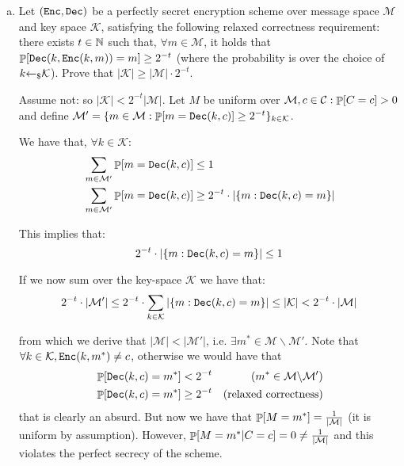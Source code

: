\begin{enumerate}[(a)]
\begin{solution}
	      \end{solution}

	\item Let $(\enc, \dec)$ be a perfectly secret encryption scheme over message space $\mathcal{M}$ and key space $\mathcal{K}$, satisfying the following relaxed correctness requirement: there exists $t \in \N$ such that, $\forall m \in \mathcal{M}$, it holds that $\P[\dec(k, \enc(k, m)) = m] \ge 2^{-t}$ (where the probability is over the choice of $k \ud \mathcal{K}$). Prove that $|\mathcal{K}| \ge |\mathcal{M}| \cdot 2^{-t}$.

	      \begin{solution}
		      Assume not: so $|\mathcal{K}| < 2^{-t}|\mathcal{M}|$.
		      Let $M$ be uniform over $\mathcal{M}, c \in \mathcal{C}: \P[C=c] > 0$ and define $\mathcal{M}' = \{ m \in \mathcal{M}: \P[m = \dec(k,c)] \ge 2^{-t}\}_{k \in \mathcal{K}}$.

		      We have that, $\forall k \in \mathcal{K}$:
		      \begin{align}
			       & \sum_{m \in \mathcal{M}'} \P[m=\dec(k, c)] \le 1                                    \\
			       & \sum_{m \in \mathcal{M}'} \P[m=\dec(k, c)] \ge 2^{-t} \cdot |\{m: \dec(k, c) = m\}|
		      \end{align}

		      This implies that:
		      \[ 2^{-t} \cdot |\{m: \dec(k, c) = m\}| \le 1 \]

		      If we now sum over the key-space $\mathcal{K}$ we have that:
		      \[2^{-t}\cdot |\mathcal{M}'| \le 2^{-t}\cdot \sum_{k \in \mathcal{K}} |\{m: \dec(k, c) = m\}| \le |\mathcal{K}| < 2^{-t}\cdot |\mathcal{M}| \]

		      from which we derive that $|\mathcal{M}| < |\mathcal{M}'|$, i.e. $\exists m^* \in \mathcal{M} \backslash \mathcal{M}'$.
		      Note that $\forall k \in \mathcal{K}, \enc(k, m^*)\ne c$, otherwise we would have that
		      \begin{align}
			       & \P[\dec(k, c) = m^*] < 2^{-t}   & (m^* \in  \mathcal{M} \backslash \mathcal{M}') \\
			       & \P[\dec(k, c) = m^*] \ge 2^{-t} & (\mbox{relaxed correctness})
		      \end{align}
		      that is clearly an absurd. But now we have that $\P[M=m^*] = \frac{1}{|\mathcal{M}|}$ (it is uniform by assumption). However, $\P[M=m^*|C=c] = 0 \ne \frac{1}{|\mathcal{M}|}$ and this violates the perfect secrecy of the scheme.
	      \end{solution}
\end{enumerate}